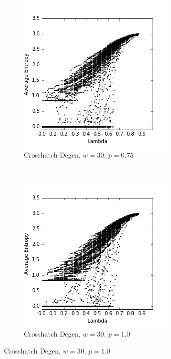 \documentclass[a4paper,11pt,twoside]{report}
\begin{document}
\begin{figure}[htp]
\begin{subfigure}[t]{0.4\textwidth}
  \end{subfigure}

\begin{subfigure}[t]{0.4\textwidth}
  \centering
  \includegraphics[width=\textwidth]{ch6_figs/ch_w30_p75_entropy_scatter}
  \caption{Crosshatch Degen, $w=30$, $p=0.75$}

  \end{subfigure}
~
\begin{subfigure}[t]{0.4\textwidth}
  \centering
  \includegraphics[width=\textwidth]{ch6_figs/ch_w30_p100_entropy_scatter}
  \caption{Crosshatch Degen, $w=30$, $p=1.0$}
  \label{fig:lw_w30_p100}
  \end{subfigure}


\end{figure}
\end{document}
